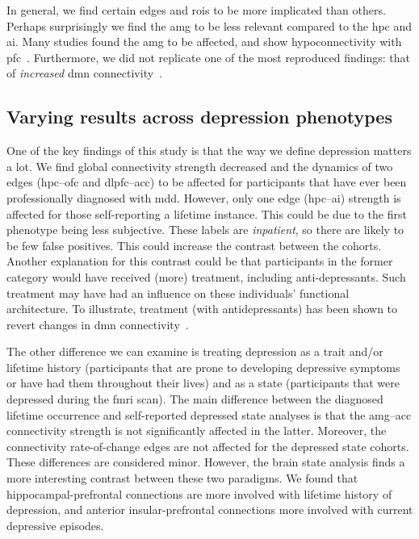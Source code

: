 In general, we find certain edges and \glspl{roi} to be more implicated than others.
Perhaps surprisingly we find the \gls{amg} to be less relevant compared to the \gls{hpc} and \gls{ai}.
Many studies found the \gls{amg} to be affected, and show hypoconnectivity with \gls{pfc}~\parencite{Dannlowski2009, Burghy2012, Kong2013, Connolly2017}.
Furthermore, we did not replicate one of the most reproduced findings: that of \emph{increased} \gls{dmn} connectivity~\parencite{Kaiser2015, Kaiser2015b, Mulders2015, Kaiser2016}.

\subsection{Varying results across depression phenotypes}\label{subsec:variation-depression-phenotypes}

One of the key findings of this study is that the way we define depression matters a lot.
We find global connectivity strength decreased and the dynamics of two edges (\gls{hpc}--\gls{ofc} and \gls{dlpfc}--\gls{acc}) to be affected for participants that have ever been professionally diagnosed with \gls{mdd}.
However, only one edge (\gls{hpc}--\gls{ai}) strength is affected for those self-reporting a lifetime instance.
This could be due to the first phenotype being less subjective.
These labels are \emph{inpatient}, so there are likely to be few false positives.
This could increase the contrast between the cohorts.
%
Another explanation for this contrast could be that participants in the former category would have received (more) treatment, including anti-depressants.
Such treatment may have had an influence on these individuals' functional architecture.
To illustrate, treatment (with antidepressants) has been shown to revert changes in \gls{dmn} connectivity~\parencite{Liston2014}.

The other difference we can examine is treating depression as a trait and/or lifetime history (participants that are prone to developing depressive symptoms or have had them throughout their lives) and as a state (participants that were depressed during the \gls{fmri} scan).
The main difference between the diagnosed lifetime occurrence and self-reported depressed state analyses is that the \gls{amg}--\gls{acc} connectivity strength is not significantly affected in the latter.
Moreover, the connectivity rate-of-change edges are not affected for the depressed state cohorts.
These differences are considered minor.
However, the brain state analysis finds a more interesting contrast between these two paradigms.
We found that hippocampal-prefrontal connections are more involved with lifetime history of depression, and anterior insular-prefrontal connections more involved with current depressive episodes.

